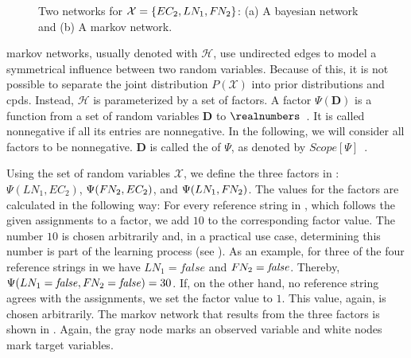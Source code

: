 \begin{figure}[t]
\centering

\caption[Two networks for $\mathcal{X}=\{EC_2,LN_1,F\rs N_2\}$]{%
  Two networks for $\mathcal{X}=\{EC_2,LN_1,F\rs N_2\}$:
  (a) A \gls{bayesian network} and (b) A \gls{markov network}.
}
\label{fig:example-networks}
\end{figure}

\bigskip

\Glspl{markov network}, usually denoted with $\mathcal{H}$, use undirected \glspl{edge} to model a symmetrical influence between two \glspl{random variable}.
Because of this, it is not possible to separate the \gls{joint distribution} $P(\mathcal{X})$ into \glspl{prior distribution} and \glspl{cpd}.
Instead, $\mathcal{H}$ is parameterized by a set of \glspl{factor}.
A \gls{factor} $\Psi(\mathbf{D})$ is a function from a set of \glspl{random variable} $\mathbf{D}$ to $\realnumbers$~\citep{koller2009probabilistic}.
It is called nonnegative if all its entries are nonnegative.
In the following, we will consider all factors to be nonnegative.
$\mathbf{D}$ is called the  of $\Psi$, as denoted by $Scope[\Psi]$~\citep{koller2009probabilistic}.

Using the set of \glspl{random variable} $\mathcal{X}$, we define the three factors in : $\Psi(LN_1,EC_2)$, $\Psi(F\hspace{-0.07em} N_2,EC_2)$, and $\Psi(LN_1,F\hspace{-0.07em} N_2)$.
The values for the factors are calculated in the following way:
For every reference string in , which follows the given \glspl{assignment} to a \gls{factor}, we add $10$ to the corresponding factor value.
The number $10$ is chosen arbitrarily and, in a practical use case, determining this number is part of the learning process (see ).
As an example, for three of the four reference strings in  we have $LN_1=\mathit{false}$ and $F\hspace{-0.07em} N_2=\mathit{false}$.
Thereby, $\Psi(LN_1=\mathit{false},F\hspace{-0.07em} N_2=\mathit{false})=30$.
If, on the other hand, no reference string agrees with the \glspl{assignment}, we set the factor value to $1$.
This value, again, is chosen arbitrarily.
The \gls{markov network} that results from the three \glspl{factor} is shown in .
Again, the gray \gls{node} marks an \gls{observed variable} and white \glspl{node} mark \glspl{target variable}.

